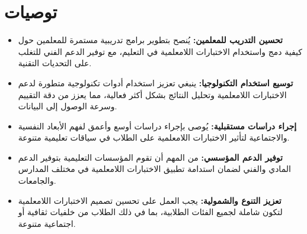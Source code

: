 \chapter*{توصيات}
\begin{itemize}
	\item \textbf{تحسين التدريب للمعلمين:} يُنصح بتطوير برامج تدريبية مستمرة للمعلمين حول كيفية دمج واستخدام الاختبارات اللامعلمية في التعليم، مع توفير الدعم الفني للتغلب على التحديات التقنية.
	
	\item \textbf{توسيع استخدام التكنولوجيا:} ينبغي تعزيز استخدام أدوات تكنولوجية متطورة لدعم الاختبارات اللامعلمية وتحليل النتائج بشكل أكثر فعالية، مما يعزز من دقة التقييم وسرعة الوصول إلى البيانات.
	
	\item \textbf{إجراء دراسات مستقبلية:} يُوصى بإجراء دراسات أوسع وأعمق لفهم الأبعاد النفسية والاجتماعية لتأثير الاختبارات اللامعلمية على الطلاب في سياقات تعليمية متنوعة.
	
	\item \textbf{توفير الدعم المؤسسي:} من المهم أن تقوم المؤسسات التعليمية بتوفير الدعم المادي والفني لضمان استدامة تطبيق الاختبارات اللامعلمية في مختلف المدارس والجامعات.
	
	\item \textbf{تعزيز التنوع والشمولية:} يجب العمل على تحسين تصميم الاختبارات اللامعلمية لتكون شاملة لجميع الفئات الطلابية، بما في ذلك الطلاب من خلفيات ثقافية أو اجتماعية متنوعة.
\end{itemize}